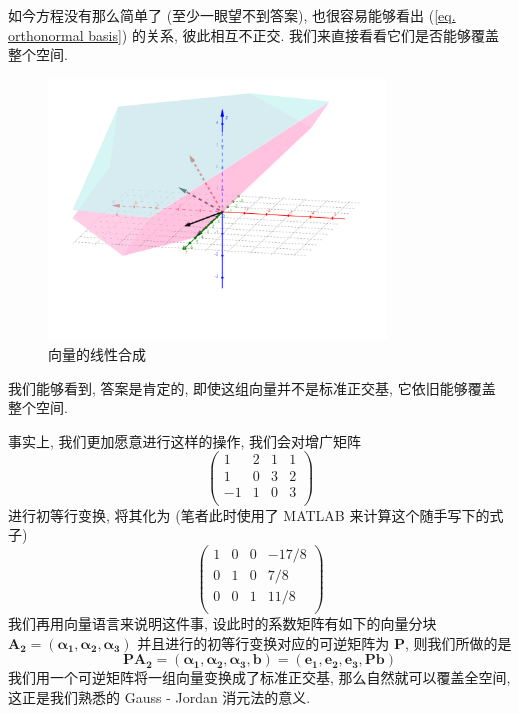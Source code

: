 \documentclass[UTF8]{book}
\begin{document}
    如今方程没有那么简单了 (至少一眼望不到答案), 也很容易能够看出 
    (\ref{eq. orthonormal basis}) 的关系, 彼此相互不正交. 
    我们来直接看看它们是否能够覆盖整个空间. 

    \begin{figure}[hbtp]
        \centering
        \includegraphics[width = 0.8\textwidth]{linear equation 2.png}
        \caption{向量的线性合成}
        \label{fig. linear equation 2}
    \end{figure}
    我们能够看到, 答案是肯定的, 即使这组向量并不是标准正交基, 它依旧能够覆盖
    整个空间.

    事实上, 我们更加愿意进行这样的操作, 我们会对增广矩阵
    \begin{equation}
        \begin{pmatrix}
            1 & 2 & 1 & 1 \\
            1 & 0 & 3 & 2\\
            -1 & 1 & 0 & 3\\
        \end{pmatrix}
    \end{equation}
    进行初等行变换, 将其化为 (笔者此时使用了 MATLAB 来计算这个随手写下的式子)
    \begin{equation}
        \begin{pmatrix}
            1 & 0 & 0 & -17/8 \\
            0 & 1 & 0 & 7/8\\
            0 & 0 & 1 & 11/8\\
        \end{pmatrix}
    \end{equation}
    我们再用向量语言来说明这件事, 设此时的系数矩阵有如下的向量分块 
    $\boldsymbol{A_2} = (\boldsymbol{\alpha_1},
    \boldsymbol{\alpha_2},\boldsymbol{\alpha_3})$ 
    并且进行的初等行变换对应的可逆矩阵为 $\boldsymbol{P}$, 
    则我们所做的是 
    \begin{equation}
        \boldsymbol{P}\boldsymbol{A_2} = (\boldsymbol{\alpha_1},
        \boldsymbol{\alpha_2},\boldsymbol{\alpha_3},\boldsymbol{b}) =
        (\boldsymbol{e_1},\boldsymbol{e_2},\boldsymbol{e_3},
        \boldsymbol{P}\boldsymbol{b})
    \end{equation}
    我们用一个可逆矩阵将一组向量变换成了标准正交基, 那么自然就可以覆盖全空间, 
    这正是我们熟悉的 Gauss - Jordan 消元法的意义. 
    
\end{document}
